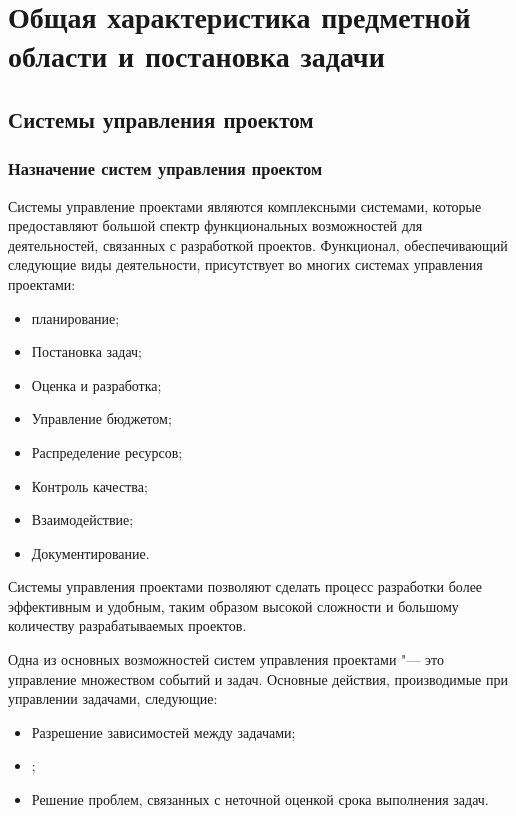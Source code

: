 \chapter{Общая характеристика предметной области и постановка задачи}
\section{Системы управления проектом}
\subsection{Назначение систем управления проектом}

Системы управление проектами являются комплексными системами, которые
предоставляют большой спектр функциональных возможностей для деятельностей,
связанных с разработкой проектов. Функционал, обеспечивающий следующие виды
деятельности, присутствует во многих системах управления проектами:
\begin{itemize}
  \item планирование; 
  \item Постановка задач;
  \item Оценка и разработка;
  \item Управление бюджетом;
  \item Распределение ресурсов;
  \item Контроль качества;
  \item Взаимодействие;
  \item Документирование.
\end{itemize}
Системы управления проектами позволяют сделать процесс разработки более
эффективным и удобным, таким образом  высокой сложности и
большому количеству разрабатываемых проектов. 

Одна из основных возможностей систем управления проектами "--- это
управление множеством событий и задач. Основные действия, производимые
при управлении задачами, следующие:
\begin{itemize}
  \item Разрешение зависимостей между задачами;
  \item {};
  \item Решение проблем, связанных с неточной оценкой срока выполнения задач.
\end{itemize}

